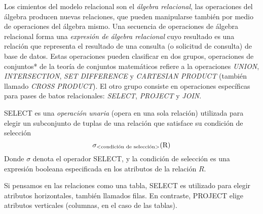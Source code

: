 Los cimientos del modelo relacional son el \emph{álgebra relacional}, las operaciones del álgebra producen nuevas relaciones, que pueden manipularse también por medio de operaciones del álgebra mismo. Una secuencia de operaciones de álgebra relacional forma una \emph{expresión de álgebra relacional} cuyo resultado es una relación que representa el resultado de una consulta (o solicitud de consulta) de base de datos. Estas operaciones pueden clasificar en dos grupos, operaciones de conjuntos* de la teoría de conjuntos matemáticos refiere a la operaciones \emph{UNION}, \emph{INTERSECTION}, \emph{SET DIFFERENCE} y \emph{CARTESIAN PRODUCT} (también llamado \emph{CROSS PRODUCT}). El otro grupo consiste en operaciones específicas para pases de batos relacionales: \emph{SELECT}, \emph{PROJECT} y \emph{JOIN}.

SELECT es una \emph{operación unaria} (opera en una sola relación) utilizada para elegir un subconjunto de tuplas de una relación que satisface su condición de selección
\begin{equation}
\sigma_\text{\textless condición de selección\textgreater}{\text{(R)}}
\end{equation}
Donde $\sigma$ denota el operador SELECT, y la condición de selección es una expresión booleana especificada en los atributos de la relación $R$.

Si pensamos en las relaciones como una tabla, SELECT es utilizado para elegir atributos horizontales, también llamados filas. En contraste, PROJECT elige atributos verticales (columnas, en el caso de las tablas).